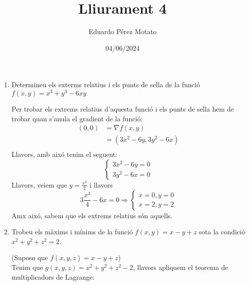 \documentclass[a4paper, 12pt]{article}
\title{Lliurament 4}
\author{Eduardo Pérez Motato}
\date{04/06/2024}
\begin{document}
    \makeheader

    \begin{exercici}
        \begin{enumerate}[label=\alph*)]
            \item Determineu els exterms relatius i els punts de sella de la funció $f\left(x,y\right)=x^3+y^3-6xy$\\
            \begin{solucio}
                Per trobar els extrems relatius d'aquesta funció i els punts de sella hem de trobar
                quan s'anula el gradient de la funció:
                \begin{displaymath}
                    \begin{split}
                        \left(0,0\right) &= \nabla f(x,y)\\
                        &= \left(3x^2-6y, 3y^2-6x\right)\\
                    \end{split}
                \end{displaymath}
                Llavors, amb aixó tenim el seguent:
                \begin{displaymath}
                    \begin{cases}
                        3x^2-6y = 0\\
                        3y^2-6x = 0
                    \end{cases}
                \end{displaymath}
                Llavors, veiem que $y = \frac{x^2}{2}$ i llavors $$3 \frac{x^4}{4}-6x = 0 \Rightarrow \begin{cases}
                    x = 0, y = 0\\
                    x = 2, y = 2
                \end{cases}$$
                Amx aixó, sabem que els extrems relatius són aquells.
            \end{solucio}
            \item Trobeu els màxims i mínims de la funció \( f(x, y) = x - y + z \) sota la condició \( x^2 + y^2 + z^2 = 2 \).\\
            \begin{solucio}
                (Suposo que $f\left(x,y,z\right) = x-y+z$)\\
                Tenim que $g(x,y,z) = x^2+y^2+z^2 - 2$, llavors apliquem el teorema de multiplicadors
                de Lagrange:
                \begin{displaymath}

\end{displaymath}
\end{solucio}
\end{enumerate}
\end{exercici}
\end{document}
